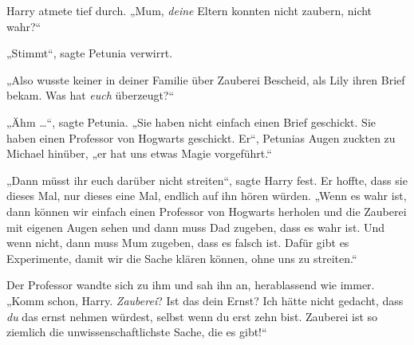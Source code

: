 Harry atmete tief durch.
„Mum, \emph{deine} Eltern konnten nicht zaubern, nicht wahr?“

„Stimmt“, sagte Petunia verwirrt.

„Also wusste keiner in deiner Familie über Zauberei Bescheid, als Lily ihren Brief bekam. Was hat \emph{euch} überzeugt?“

„Ähm …“, sagte Petunia.
„Sie haben nicht einfach einen Brief geschickt. Sie haben einen Professor von Hogwarts geschickt. Er“, Petunias Augen zuckten zu Michael hinüber, „er hat uns etwas Magie vorgeführt.“

„Dann müsst ihr euch darüber nicht streiten“, sagte Harry fest. Er hoffte, dass sie dieses Mal, nur dieses eine Mal, endlich auf ihn hören würden.
„Wenn es wahr ist, dann können wir einfach einen Professor von Hogwarts herholen und die Zauberei mit eigenen Augen sehen und dann muss Dad zugeben, dass es wahr ist. Und wenn nicht, dann muss Mum zugeben, dass es falsch ist. Dafür gibt es Experimente, damit wir die Sache klären können, ohne uns zu streiten.“

Der Professor wandte sich zu ihm und sah ihn an, herablassend wie immer.
„Komm schon, Harry. \emph{Zauberei}? Ist das dein Ernst? Ich hätte nicht gedacht, dass \emph{du} das ernst nehmen würdest, selbst wenn du erst zehn bist. Zauberei ist so ziemlich die unwissenschaftlichste Sache, die es gibt!“

